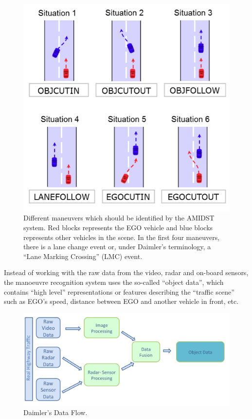 \begin{figure}
\begin{center}
\includegraphics[scale=0.4]{./figures/DaimlerManeuvers}
\caption{\label{Figure:DaimlerManeuvers}Different maneuvers which should be identified by the AMIDST system.  Red blocks represents the EGO vehicle and blue blocks represents other vehicles in the scene. In the first four maneuvers, there is a lane change event or, under Daimler's terminology, a ``Lane Marking Crossing'' (LMC) event. 
}
\end{center}
\end{figure}

Instead of working with the raw data from the video, radar and on-board sensors, the manoeuvre recognition system uses the so-called ``object data'', which contains ``high level'' representations or features describing the ``traffic scene'' such as EGO's speed, distance between EGO and another vehicle in front, etc.  
\begin{figure}
\begin{center}
\includegraphics[scale=0.35]{./figures/DaimlerDataFlow}
\caption{\label{Figure:DaimlerDataFlow} Daimler's Data Flow.}
\end{center}
\end{figure}

